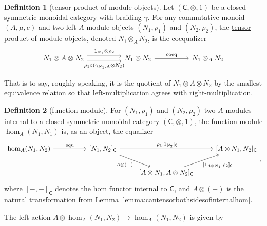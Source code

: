 \documentclass[a4paper,10pt]{scrreprt}
\newcommand{\defn}[1]{\ul{#1}}
\theoremstyle{definition}
\newtheorem{definition}{Definition}[section]
\theoremstyle{plain}
\theoremstyle{remark}
\begin{document}
\begin{definition}[tensor product of module objects]
  \label{def:tensorproductofmoduleobjects}
  Let $(\mathsf{C}, \otimes, 1)$ be a closed symmetric monoidal category with braiding $\gamma$. For any commutative monoid $(A, \mu, e)$ and two left $A$-module objects $(N_{1}, \rho_{1})$ and $(N_{2}, \rho_{2})$, the \defn{tensor product of module objects}, denoted $N_{1} \otimes_{A} N_{2}$, is the coequalizer
  \begin{equation*}
    \begin{tikzcd}[column sep=huge]
      N_{1} \otimes A \otimes N_{2}
      \arrow[r, shift left=1.5, "1_{N_{1}} \otimes \rho_{2}"]
      \arrow[r, shift right=1.5, swap, "{\rho_{1} \circ (\gamma_{N_{1}, A} \otimes N_{2})}"]
      & N_{1} \otimes N_{2}
      \arrow[r, "\mathrm{coeq}"]
      & N_{1} \otimes_{A} N_{2}
    \end{tikzcd}
  \end{equation*}

  That is to say, roughly speaking, it is the quotient of $N_{1} \otimes A \otimes N_{2}$ by the smallest equivalence relation so that left-multiplication agrees with right-multiplication.
\end{definition}

\begin{definition}[function module]
  \label{def:functionmodule}
  For $(N_{1}, \rho_{1})$ and $(N_{2}, \rho_{2})$ two $A$-modules internal to a closed symmetric monoidal category $(\mathsf{C}, \otimes, 1)$, the \defn{function module} $\hom_{A}(N_{1}, N_{1})$ is, as an object, the equalizer 
  \begin{equation*}
    \begin{tikzcd}
      \hom_{A}(N_{1}, N_{2})
      \arrow[rr, "\mathrm{equ}"]
      & & {[N_{1}, N_{2}]_{\mathsf{C}}}
      \arrow[rr, "{[\rho_{1}, 1_{N_{2}}]_{\mathsf{C}}}"]
      \arrow[dr, swap, "A \otimes (-)"]
      & & {[A \otimes N_{1}, N_{2}]_{\mathsf{C}}}
      \\
      & & & {[A \otimes N_{1}, A \otimes N_{2}]_{\mathsf{C}}}
      \arrow[ur, swap, "{[1_{A \otimes N_{1}}, \rho_2]_{\mathsf{C}}}"]
    \end{tikzcd},
  \end{equation*}
  where $[-,-]_{\mathsf{C}}$ denotes the hom functor internal to $\mathsf{C}$, and $A \otimes (-)$ is the natural transformation from \hyperref[lemma:cantensorbothsidesofinternalhom]{Lemma \ref*{lemma:cantensorbothsidesofinternalhom}}.

  The left action $A \otimes \hom_{A}(N_{1}, N_{2}) \to \hom_{A}(N_{1}, N_{2})$ is given by 
\end{definition}
\end{document}
